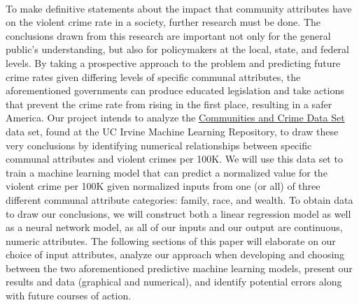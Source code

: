 \documentclass[letterpaper, 11 pt, conference]{article}
\begin{document}
\\To make definitive statements about the impact that community attributes have on the violent crime rate in a society, further research must be done. The conclusions drawn from this research are important not only for the general public's understanding, but also for policymakers at the local, state, and federal levels. By taking a prospective approach to the problem and predicting future crime rates given differing levels of specific communal attributes, the aforementioned governments can produce educated legislation and take actions that prevent the crime rate from rising in the first place, resulting in a safer America. Our project intends to analyze the \href{https://archive.ics.uci.edu/ml/datasets/Communities+and+Crime} {Communities and Crime Data Set} data set, found at the UC Irvine Machine Learning Repository, to draw these very conclusions by identifying numerical relationships between specific communal attributes and violent crimes per 100K. We will use this data set to train a machine learning model that can predict a normalized value for the violent crime per 100K given normalized inputs from one (or all) of three different communal attribute categories: family, race, and wealth. To obtain data to draw our conclusions, we will construct both a linear regression model as well as a neural network model, as all of our inputs and our output are continuous, numeric attributes. The following sections of this paper will elaborate on our choice of input attributes, analyze our approach when developing and choosing between the two aforementioned predictive machine learning models, present our results and data (graphical and numerical), and identify potential errors along with future courses of action.
\end{document}
